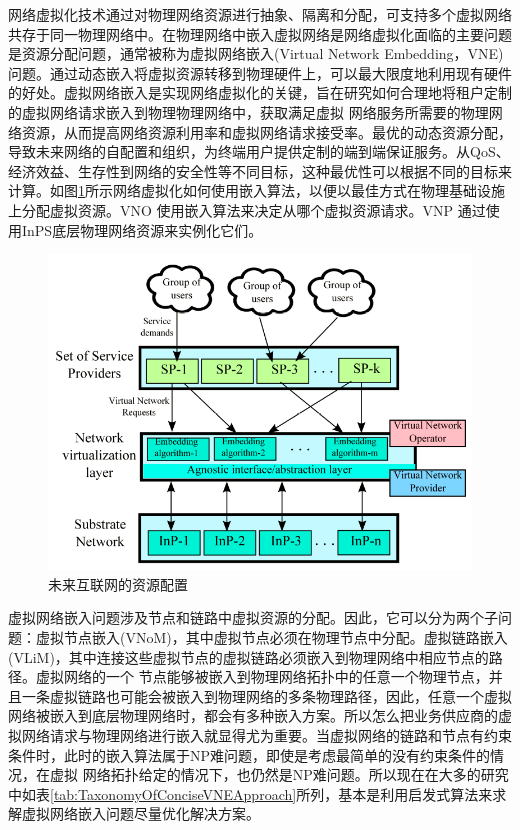 网络虚拟化技术通过对物理网络资源进行抽象、隔离和分配，可支持多个虚拟网络共存于同一物理网络中。在物理网络中嵌入虚拟网络是网络虚拟化面临的主要问题是资源分配问题，通常被称为虚拟网络嵌入(Virtual Network Embedding，VNE)问题。通过动态嵌入将虚拟资源转移到物理硬件上，可以最大限度地利用现有硬件的好处。虚拟网络嵌入是实现网络虚拟化的关键，旨在研究如何合理地将租户定制的虚拟网络请求嵌入到物理物理网络中，获取满足虚拟 网络服务所需要的物理网络资源，从而提高网络资源利用率和虚拟网络请求接受率。最优的动态资源分配，导致未来网络的自配置和组织，为终端用户提供定制的端到端保证服务。从QoS、经济效益、生存性到网络的安全性等不同目标，这种最优性可以根据不同的目标来计算。如图\ref{fig:ResourceAllocationInFutureInternet}所示网络虚拟化如何使用嵌入算法，以便以最佳方式在物理基础设施上分配虚拟资源。VNO 使用嵌入算法来决定从哪个虚拟资源请求。VNP 通过使用InPS底层物理网络资源来实例化它们。
\begin{figure}[htbp]
\centering
\includegraphics[width=5.0in]{figures/ResourceAllocationInFutureInternet}
  \caption{未来互联网的资源配置}
  \label{fig:ResourceAllocationInFutureInternet}
\end{figure}

虚拟网络嵌入问题涉及节点和链路中虚拟资源的分配。因此，它可以分为两个子问题：虚拟节点嵌入(VNoM)，其中虚拟节点必须在物理节点中分配。虚拟链路嵌入(VLiM)，其中连接这些虚拟节点的虚拟链路必须嵌入到物理网络中相应节点的路径。虚拟网络的一个 节点能够被嵌入到物理网络拓扑中的任意一个物理节点，并且一条虚拟链路也可能会被嵌入到物理网络的多条物理路径，因此，任意一个虚拟网络被嵌入到底层物理网络时，都会有多种嵌入方案。所以怎么把业务供应商的虚拟网络请求与物理网络进行嵌入就显得尤为重要。当虚拟网络的链路和节点有约束条件时，此时的嵌入算法属于NP难问题\cite{amaldi2016computational}，即使是考虑最简单的没有约束条件的情况，在虚拟 网络拓扑给定的情况下，也仍然是NP难问题\cite{amaldi2016computational}。所以现在在大多的研究中如表\ref{tab:TaxonomyOfConciseVNEApproach}所列，基本是利用启发式算法来求解虚拟网络嵌入问题尽量优化解决方案。



